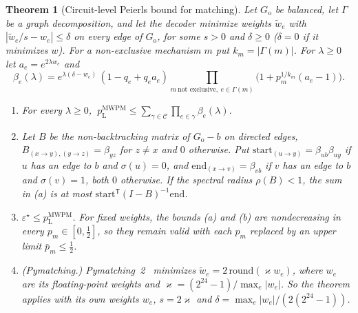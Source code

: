 \documentclass[11pt]{article}
\theoremstyle{plain}
\newtheorem{theorem}{Theorem}
\theoremstyle{definition}
\theoremstyle{remark}
\newcommand{\pM}{p_{\mathrm{L}}^{\mathrm{MWPM}}}
\newcommand{\err}{\varepsilon^{\star}}
\newcommand{\Go}{G_{\mathrm{o}}}
\newcommand{\cC}{\mathcal{C}}
\newcommand{\tw}{\tilde w}
\renewcommand{\_}{\oldunderscore\allowbreak}
\begin{document}
\begin{theorem}[Circuit-level Peierls bound for matching]\label{thm:basic}
Let $\Go$ be balanced, let $\Gamma$ be a graph decomposition, and let the decoder minimize weights $\tw_e$ with $|\tw_e/s-w_e|\le\delta$ on every edge of $\Go$, for some $s>0$ and $\delta\ge0$ ($\delta=0$ if it minimizes $w$). For a non-exclusive mechanism $m$ put $k_m=|\Gamma(m)|$. For $\lambda\ge0$ let $a_e=e^{2\lambda w_e}$ and
\[
\beta_e(\lambda)=e^{\lambda(\delta-w_e)}\,(1-q_e+q_ea_e)\prod_{m\ \text{not exclusive},\ e\in\Gamma(m)}\big(1+p_m^{1/k_m}(a_e-1)\big).
\]
\begin{enumerate}[label=(\alph*),leftmargin=*]
\item For every $\lambda\ge0$, $\ \pM\le\sum_{\gamma\in\cC}\prod_{e\in\gamma}\beta_e(\lambda)$.
\item Let $B$ be the non-backtracking matrix of $\Go-b$ on directed edges, $B_{(x\to y),(y\to z)}=\beta_{yz}$ for $z\ne x$ and $0$ otherwise. Put $\mathrm{start}_{(u\to y)}=\beta_{ub}\beta_{uy}$ if $u$ has an edge to $b$ and $\sigma(u)=0$, and $\mathrm{end}_{(x\to v)}=\beta_{vb}$ if $v$ has an edge to $b$ and $\sigma(v)=1$, both $0$ otherwise. If the spectral radius $\rho(B)<1$, the sum in (a) is at most $\mathrm{start}^{\mathsf T}(I-B)^{-1}\mathrm{end}$.
\item $\err\le\pM$. For fixed weights, the bounds (a) and (b) are nondecreasing in every $p_m\in[0,\tfrac12]$, so they remain valid with each $p_m$ replaced by an upper limit $\bar p_m\le\tfrac12$.
\item (Pymatching.) Pymatching~2~\cite{SB} minimizes $\tw_e=2\,\mathrm{round}(\varkappa w_e)$, where $w_e$ are its floating-point weights and $\varkappa=(2^{24}-1)/\max_e|w_e|$. So the theorem applies with its own weights $w_e$, $s=2\varkappa$ and $\delta=\max_e|w_e|/(2(2^{24}-1))$.
\end{enumerate}
\end{theorem}
\end{document}
